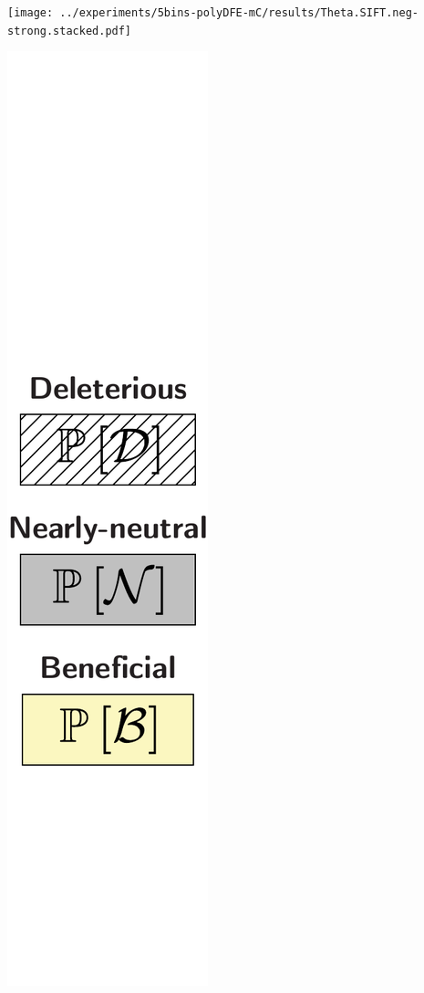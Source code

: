 \documentclass{article}
\begin{document}
\begin{center}
\begin{minipage}{0.09\linewidth}
        \end{minipage}
        \begin{minipage}{0.9\linewidth}
            \texttt{[image: ../experiments/5bins-polyDFE-mC/results/Theta.SIFT.neg-strong.stacked.pdf]} \\
        \end{minipage}
        \begin{minipage}{0.09\linewidth}
            \includegraphics[width=\linewidth, page=1]{artworks/legend.polycat}

\end{minipage}
\end{center}
\end{document}
